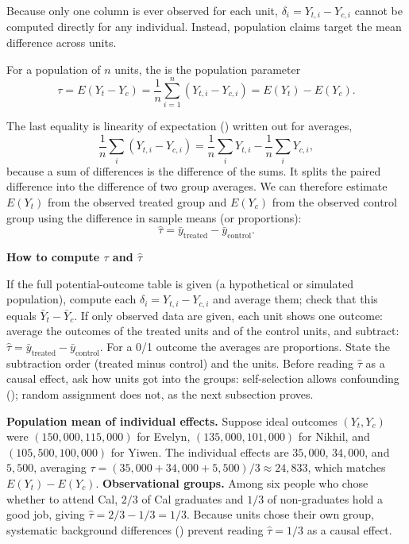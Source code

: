 \documentclass[10pt]{scrartcl}
\newenvironment{howto}[1]{\begin{mdframed}[style=howtostyle]{\color{NavyBlue}\textbf{#1}}\par\vspace{2pt}}{\end{mdframed}}
\begin{document}
\medskip\noindent Because only one column is ever observed for each unit, $\delta_i = Y_{t,i} - Y_{c,i}$ cannot be computed directly for any individual. Instead, population claims target the mean difference across units.

\begin{definition*}
  For a population of $n$ units, the  is the population parameter
  \[
    \tau = E(Y_t - Y_c) = \frac{1}{n}\sum_{i=1}^n (Y_{t,i} - Y_{c,i}) = E(Y_t) - E(Y_c).
  \]
\end{definition*}

The last equality is linearity of expectation () written out for averages,
\[
  \frac1n\sum_i (Y_{t,i}-Y_{c,i}) = \frac1n\sum_i Y_{t,i} - \frac1n\sum_i Y_{c,i},
\]
because a sum of differences is the difference of the sums. It splits the paired difference into the difference of two group averages. We can therefore estimate $E(Y_t)$ from the observed treated group and $E(Y_c)$ from the observed control group using the difference in sample means (or proportions):
\[
  \hat\tau = \bar y_{\text{treated}} - \bar y_{\text{control}}.
\]

\begin{howto}{How to compute $\tau$ and $\hat\tau$}
\begin{steps}
  \ii If the full potential-outcome table is given (a hypothetical or simulated population), compute each $\delta_i = Y_{t,i} - Y_{c,i}$ and average them; check that this equals $\bar Y_t - \bar Y_c$.
  \ii If only observed data are given, each unit shows one outcome: average the outcomes of the treated units and of the control units, and subtract: $\hat\tau = \bar y_{\text{treated}} - \bar y_{\text{control}}$. For a 0/1 outcome the averages are proportions.
  \ii State the subtraction order (treated minus control) and the units.
  \ii Before reading $\hat\tau$ as a causal effect, ask how units got into the groups: self-selection allows confounding (); random assignment does not, as the next subsection proves.
\end{steps}
\end{howto}

\begin{example*}
  \begin{itemize}
    \ii \textbf{Population mean of individual effects.} Suppose ideal outcomes $(Y_t, Y_c)$ were $(150{,}000, 115{,}000)$ for Evelyn, $(135{,}000, 101{,}000)$ for Nikhil, and $(105{,}500, 100{,}000)$ for Yiwen. The individual effects are $35{,}000$, $34{,}000$, and $5{,}500$, averaging $\tau = (35{,}000 + 34{,}000 + 5{,}500)/3 \approx 24{,}833$, which matches $E(Y_t) - E(Y_c)$.
    \ii \textbf{Observational groups.} Among six people who chose whether to attend Cal, $2/3$ of Cal graduates and $1/3$ of non-graduates hold a good job, giving $\hat\tau = 2/3 - 1/3 = 1/3$. Because units chose their own group, systematic background differences () prevent reading $\hat\tau = 1/3$ as a causal effect.
  \end{itemize}
\end{example*}
\end{document}
